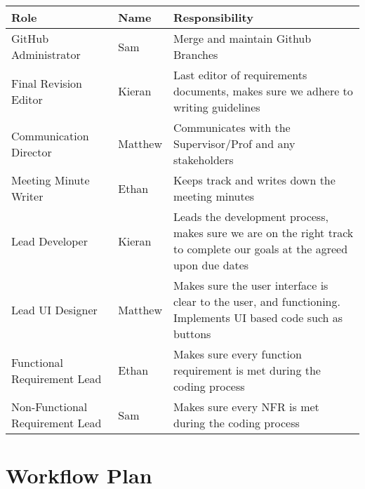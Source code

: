 \documentclass{article}
\begin{document}
\begin{tabularx}{0.8\textwidth} { 
  | >{\raggedright\arraybackslash}X 
  | >{\centering\arraybackslash}X 
  | >{\raggedleft\arraybackslash}X | }
\hline
  Role & Name & Responsibility\\
\hline
 GitHub Administrator & Sam & Merge and maintain Github Branches \\
\hline
 Final Revision Editor  & Kieran & Last editor of requirements documents, makes sure we adhere to writing guidelines  \\
\hline
Communication Director  & Matthew & Communicates with the Supervisor/Prof and any stakeholders \\
\hline
Meeting Minute Writer & Ethan & Keeps track and writes down the meeting minutes \\
\hline
Lead Developer & Kieran & Leads the development process, makes sure we are on the right track to complete our goals at the agreed upon due dates \\
\hline
Lead UI Designer & Matthew & Makes sure the user interface is clear to the user, and functioning. Implements UI based code such as buttons\\
\hline
Functional Requirement Lead & Ethan & Makes sure every function requirement is met during the coding process\\
\hline
Non-Functional Requirement Lead & Sam & Makes sure every NFR is met during the coding process\\
\hline
\end{tabularx}

\section{Workflow Plan}
\end{document}
